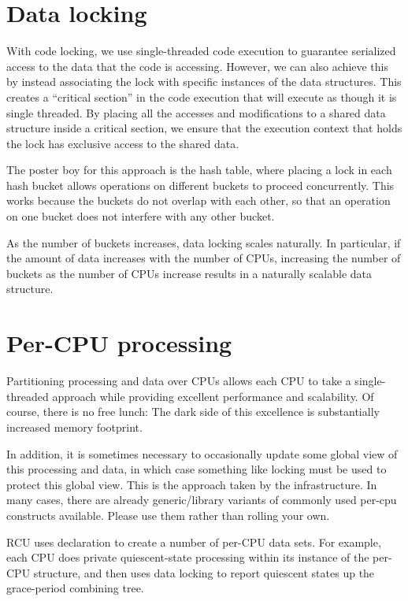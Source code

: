\section{Data locking}

With code locking, we use single-threaded code execution to guarantee
serialized access to the data that the code is accessing.
However, we can also achieve this by instead associating the lock
with specific instances of the data structures.
This creates a ``critical section'' in the code execution that will
execute as though it is single threaded.
By placing all the accesses and modifications to a shared data structure
inside a critical section, we ensure that the execution context that
holds the lock has exclusive access to the shared data.

The poster boy for this approach is the hash table, where placing a lock
in each hash bucket allows operations on different buckets to proceed
concurrently.
This works because the buckets do not overlap with each other, so that
an operation on one bucket does not interfere with any other bucket.

As the number of buckets increases, data locking scales naturally.
In particular, if the amount of data increases with the number of CPUs,
increasing the number of buckets as the number of CPUs increase results
in a naturally scalable data structure.


\section{Per-CPU processing}

Partitioning processing and data over CPUs allows each CPU to take
a single-threaded approach while providing excellent performance and
scalability.
Of course, there is no free lunch:
The dark side of this excellence is substantially increased memory footprint.

In addition, it is sometimes necessary to occasionally update some global
view of this processing and data, in which case something like locking
must be used to protect this global view.
This is the approach taken by the  infrastructure.
In many cases, there are already generic/library variants of commonly
used per-cpu constructs available.
Please use them rather than rolling your own.

RCU uses  declaration to create a number of per-CPU
data sets.
For example, each CPU does private quiescent-state processing within
its instance of the per-CPU  structure, and then uses data
locking to report quiescent states up the grace-period combining tree.


